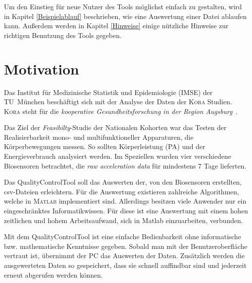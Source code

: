 \documentclass[onecolumn,german]{article}
\begin{document}
Um den Einstieg für neue Nutzer des Tools möglichst einfach zu gestalten, wird in Kapitel \ref{Beispielablauf} beschrieben, wie eine Auswertung einer Datei ablaufen kann. Außerdem werden in Kapitel \ref{Hinweise} einige nützliche Hinweise zur richtigen Benutzung des Tools gegeben.


\section{Motivation}

Das Institut für Medizinische Statistik und Epidemiologie (IMSE) der \mbox{TU München} beschäftigt sich mit der Analyse der Daten der \textsc{Kora} Studien. \textsc{Kora} steht für die \textit{kooperative Gesundheitsforschung in der Region Augsburg}~\cite{KORA}.\newline

Das Ziel der \textit{Feasibilty}-Studie der Nationalen Kohorten war das Testen der Realisierbarkeit mono- und multifunktioneller Apparaturen, die Körperbewegungen messen. So sollten Körperleistung (PA) und der Energieverbrauch analysiert werden. Im Speziellen wurden vier verschiedene Biosensoren betrachtet, die \textit{raw acceleration data}\footnotemark{} für mindestens 7 Tage lieferten.\newline

Das QualityControlTool soll das Auswerten der, von den Biosensoren erstellten, csv-Dateien\footnotemark {} erleichtern. Für die Auswertung existieren zahlreiche Algorithmen, welche in \textsc{Matlab} implementiert sind. Allerdings besitzen viele Anwender nur ein eingeschränktes Informatikwissen. Für diese ist eine Auswertung mit einem hohen zeitlichen und hohem Arbeitsaufwand, sich in Matlab einzuarbeiten, verbunden.\newline
\newpage

Mit dem QualityControlTool ist eine einfache Bedienbarkeit ohne informatische bzw. mathematische Kenntnisse gegeben. 
Sobald man mit der Benutzeroberfläche vertraut ist, übernimmt der PC das Auswerten der Daten. Zusätzlich werden die ausgewerteten Daten so gespeichert, dass sie schnell auffindbar sind und jederzeit erneut abgerufen werden können. 
\end{document}
